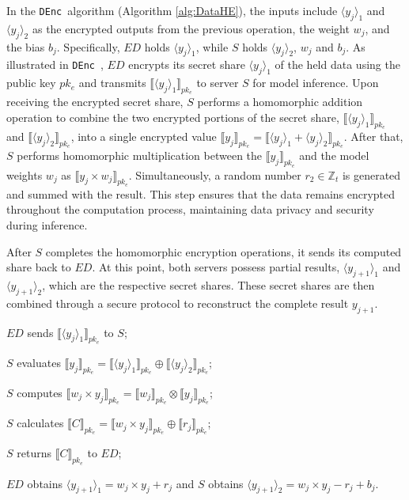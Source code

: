 \documentclass[conference]{IEEEtran}
\newcommand{\DEnc}{\texttt{DEnc}}
\begin{document}
In the \DEnc~algorithm (Algorithm \ref{alg:DataHE}), the inputs include $\langle y_j\rangle_1$ and $\langle  y_j\rangle_2$ as the encrypted outputs from the previous operation, the weight $w_j$, and the bias $b_j$. Specifically, $ED$ holds $\langle y_j\rangle_1$, while $S$ holds $\langle y_j\rangle_2$, $w_j$ and $b_j$. As illustrated in \DEnc~, $ED$ encrypts its secret share $\langle y_j \rangle_1$ of the held data using the public key $pk_e$ and transmits $\llbracket\langle y_j \rangle_1\rrbracket_{pk_e}$ to server $S$ for model inference. Upon receiving the encrypted secret share, $S$ performs a homomorphic addition operation to combine the two encrypted portions of the secret share, $\llbracket\langle y_j \rangle_1\rrbracket_{pk_e}$ and $\llbracket\langle y_j \rangle_2\rrbracket_{pk_e}$, into a single encrypted value $\llbracket y_j \rrbracket_{pk_e}=\llbracket \langle y_j \rangle_1 +  \langle y_j \rangle_2\rrbracket_{pk_e}$. After that, $S$ performs homomorphic multiplication between the $\llbracket y_j \rrbracket_{pk_e}$ and the model weights $w_j$ as $\llbracket y_j\times w_j \rrbracket_{pk_e}$. Simultaneously, a random number $r_2 \in \mathbb{Z}_t$ is generated and summed with the result. This step ensures that the data remains encrypted throughout the computation process, maintaining data privacy and security during inference.
 
After $S$ completes the homomorphic encryption operations, it sends its computed share back to $ED$. At this point, both servers possess partial results, $\langle y_{j+1} \rangle_1$ and $\langle y_{j+1} \rangle_2$, which are the respective secret shares. These secret shares are then combined through a secure protocol to reconstruct the complete result $y_{j+1}$.
\begin{algorithm}[htbp]
	\caption{\DEnc$(\langle y_j \rangle_1,\langle y_j \rangle_2,w_{j},b_{j}) \rightarrow (\langle y_{j+1}\rangle_1,\langle y_{j+1}\rangle_2)$\!\!\!\!\!}
    \label{alg:DataHE}
    \LinesNumbered
    $ED$ sends $\llbracket\langle y_j \rangle_1\rrbracket_{pk_e}$ to $S$;
    
    $S$ evaluates $\llbracket y_j \rrbracket_{pk_e} = \llbracket \langle y_j \rangle_1 \rrbracket_{pk_e}  \oplus  \llbracket\langle y_j\rangle_2\rrbracket_{pk_e}$;
    
    $S$ computes $\llbracket w_{j} \times y_j \rrbracket_{pk_e} = \llbracket w_{j} \rrbracket_{pk_e} \otimes \llbracket  y_{j} \rrbracket_{pk_e}$;
    
    $S$ calculates $\llbracket C \rrbracket_{pk_e} = \llbracket w_{j} \times y_{j} \rrbracket_{pk_e} \oplus \llbracket r_{j} \rrbracket_{pk_e}$;
    
    $S$ returns $\llbracket C \rrbracket_{pk_e}$ to $ED$;
    
    $ED$ obtains $\langle y_{j+1}\rangle_1=w_{j} \times y_{j}+r_{j}$ and $S$ obtains $\langle y_{j+1} \rangle_2 = w_j \times y_{j}-r_j+b_j$.
\end{algorithm}
\end{document}
